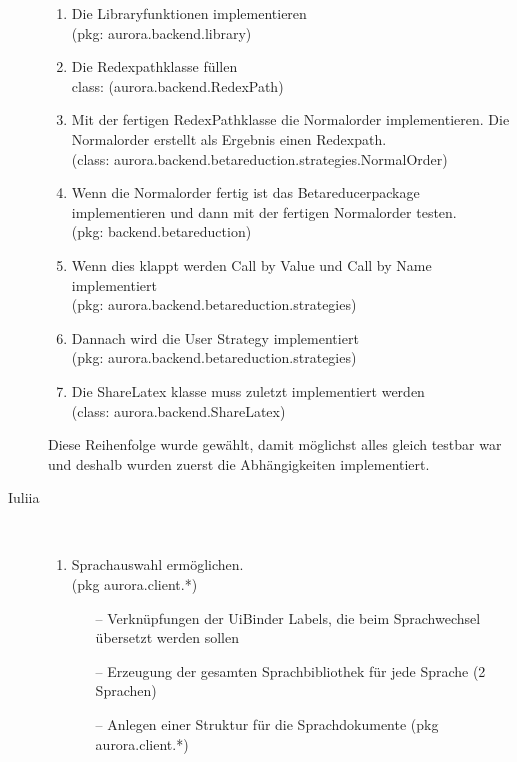 \documentclass[parskip=full,11pt,twoside]{scrartcl}
\begin{document}
\begin{description}
\begin{enumerate}
    \item  Die Libraryfunktionen implementieren \\(pkg: aurora.backend.library)
    \item Die Redexpathklasse füllen \\class: (aurora.backend.RedexPath)
    \item Mit der fertigen RedexPathklasse die Normalorder implementieren. Die Normalorder erstellt als Ergebnis einen Redexpath. \\(class: aurora.backend.betareduction.strategies.NormalOrder)
    \item Wenn die Normalorder fertig ist das Betareducerpackage implementieren und dann mit der fertigen Normalorder testen.
    \\ (pkg: backend.betareduction)
    \item Wenn dies klappt werden Call by Value und Call by Name implementiert  \\(pkg: aurora.backend.betareduction.strategies)
\item Dannach wird die User Strategy implementiert \\(pkg: aurora.backend.betareduction.strategies)

\item Die ShareLatex klasse muss zuletzt implementiert werden\\(class: aurora.backend.ShareLatex)
    \end{enumerate}
Diese Reihenfolge wurde gewählt, damit möglichst alles gleich testbar war und deshalb wurden zuerst die Abhängigkeiten implementiert.
    \item [Iuliia]\hfill \\


    \begin{enumerate}


    \item Sprachauswahl ermöglichen.  \\(pkg aurora.client.*)

    \begin{itemize}

	\item[--] Verknüpfungen der UiBinder Labels, die beim Sprachwechsel übersetzt werden sollen

	\item[--] Erzeugung der gesamten Sprachbibliothek für jede Sprache (2 Sprachen)

	\item[--] Anlegen einer Struktur für die Sprachdokumente (pkg aurora.client.*)


\end{itemize}
\end{enumerate}
\end{description}
\end{document}
